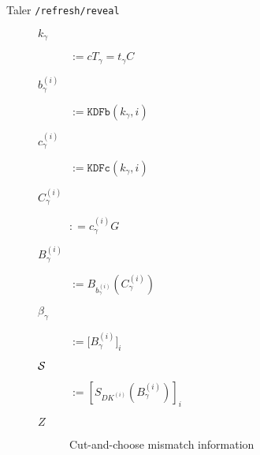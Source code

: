 \begin{frame}{Taler {\tt /refresh/reveal}}
\begin{figure}[th]
\begin{minipage}[b]{0.45\linewidth}
\begin{description}
      \item[$k_\gamma$] $:= c T_\gamma = t_\gamma C$ 
      \item[$b_\gamma^{(i)}$] $:= \texttt{KDFb}(k_\gamma,i)$ 
      \item[$c_\gamma^{(i)}$] $:= \texttt{KDFc}(k_\gamma,i)$ 
      \item[$C_\gamma^{(i)}$] $: = c_\gamma^{(i)} G$ 

      \item[$B_\gamma^{(i)}$] $:= B_{b_\gamma^{(i)}}(C_\gamma^{(i)})$
      \item[$\beta_\gamma$] $:= \big[ B_\gamma^{(i)} \big]_i$
      \item[$\cal S$] $:= \left[ S_{DK^{(i)}}( B_\gamma^{(i)} ) \right]_i$ \\ \smallskip

      \item[$Z$] Cut-and-choose mismatch information
      \end{description}
    \end{minipage}
  \end{figure}
\end{frame}


